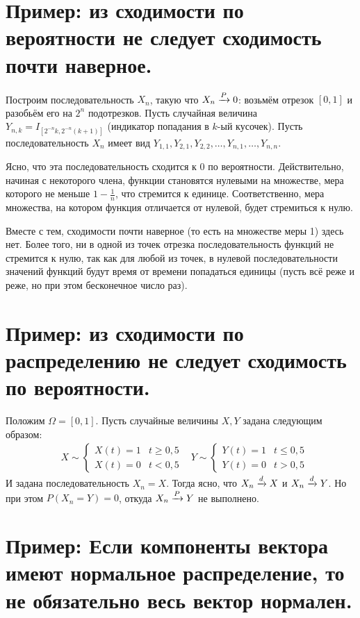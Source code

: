 \section{Пример: из сходимости по вероятности не следует сходимость почти наверное.}
Построим последовательность $X_n$, такую что $X_n \xrightarrow{P} 0$:
возьмём отрезок $[0, 1]$ и разобьём его на $2^n$ подотрезков. Пусть случайная величина
$Y_{n, k} = I_{[2^{-n}k, 2^{-n}(k+1)]}$ (индикатор попадания в $k$-ый кусочек).
Пусть последовательность $X_n$ имеет вид $Y_{1,1}, Y_{2, 1}, Y_{2, 2}, \ldots, Y_{n, 1}, \ldots, Y_{n, n}$.

Ясно, что эта последовательность сходится к 0 по вероятности. Действительно, начиная с некоторого члена,
функции становятся нулевыми на множестве, мера которого не меньше $1 - \frac{1}{n}$, что стремится к
единице. Соответственно, мера множества, на котором функция отличается от нулевой, будет стремиться к
нулю.

Вместе с тем, сходимости почти наверное (то есть на множестве меры 1) здесь нет.
Более того, ни в одной из точек отрезка последовательность функций не стремится к нулю,
так как для любой из точек, в нулевой последовательности значений функций будут время от времени
попадаться единицы (пусть всё реже и реже, но при этом бесконечное число раз).


\section{Пример: из сходимости по распределению не следует сходимость по вероятности.}
Положим $\Omega = [0, 1]$. Пусть случайные величины $X, Y$ задана следующим образом:
\begin{align*}
    &X \sim \begin{cases}
               X(t) = 1 & t \geq 0,5\\
               X(t) = 0 & t < 0,5
    \end{cases}
    &Y \sim \begin{cases}
                Y(t) = 1 & t \leq 0,5\\
                Y(t) = 0 & t > 0,5
    \end{cases}
\end{align*}
И задана последовательность $X_n = X$. Тогда ясно, что $X_n \xrightarrow{d} X$ и $X_n \xrightarrow{d} Y$. Но при этом
$P(X_n = Y) = 0$, откуда $X_n \xrightarrow{P} Y$ не выполнено.

\section{Пример: Если компоненты вектора имеют нормальное распределение, то не обязательно весь
вектор нормален.}

